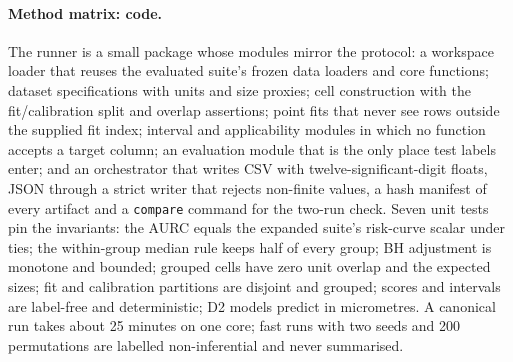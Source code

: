 \documentclass[11pt,a4paper]{article}
\begin{document}
\paragraph{Method matrix: code.} The runner is a small package whose modules
mirror the protocol: a workspace loader that reuses the evaluated suite's
frozen data loaders and core functions; dataset specifications with units and
size proxies; cell construction with the fit/calibration split and overlap
assertions; point fits that never see rows outside the supplied fit index;
interval and applicability modules in which no function accepts a target
column; an evaluation module that is the only place test labels enter; and an
orchestrator that writes CSV with twelve-significant-digit floats, JSON
through a strict writer that rejects non-finite values, a hash manifest of
every artifact and a \texttt{compare} command for the two-run check. Seven
unit tests pin the invariants: the AURC equals the expanded suite's
risk-curve scalar under ties; the within-group median rule keeps half of
every group; BH adjustment is monotone and bounded; grouped cells have zero
unit overlap and the expected sizes; fit and calibration partitions are
disjoint and grouped; scores and intervals are label-free and deterministic;
D2 models predict in micrometres. A canonical run takes about 25 minutes on
one core; fast runs with two seeds and 200 permutations are labelled
non-inferential and never summarised.
\end{document}
